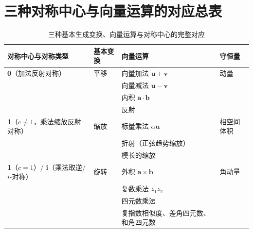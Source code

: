 \section{\texorpdfstring{三种对称中心与向量运算的对应总表}{三种对称中心与向量运算的对应总表}}

\begin{table}[htbp]
    \centering
    \caption{三种基本生成变换、向量运算与对称中心的完整对应}
    \label{tab:symmetry_correspondence}
    \renewcommand{\arraystretch}{1.35}
    \begin{tabular}{>{\centering\arraybackslash}p{2.5cm}>{\centering\arraybackslash}p{2.5cm}>{\centering\arraybackslash}p{4.5cm}>{\centering\arraybackslash}p{3cm}}
        \toprule
        对称中心与对称类型 & 基本变换 & 向量运算 & 守恒量 \\
        \midrule
        \textbf{0}（加法反射对称） & 平移 & 向量加法 $\mathbf{u}+\mathbf{v}$ & 动量 \\[4pt]
         &  & 向量减法 $\mathbf{u}-\mathbf{v}$ &  \\[4pt]
         &  & 内积 $\mathbf{a}\cdot\mathbf{b}$ &  \\[4pt]
         &  & 反射 &  \\
        \midrule
        \textbf{1}（$c \neq 1$，乘法缩放反射对称） & 缩放 & 标量乘法 $\alpha\mathbf{u}$ & 相空间体积 \\[4pt]
         &  & 折射（正弦趋势缩放） &  \\[4pt]
         &  & 模长的缩放 &  \\
        \midrule
        \textbf{1}（$c=1$）/ \textbf{i}（乘法取逆/$i$-对称） & 旋转 & 外积 $\mathbf{a}\times\mathbf{b}$ & 角动量 \\[4pt]
         &  & 复数乘法 $z_1 z_2$ &  \\[4pt]
         &  & 四元数乘法 &  \\[4pt]
         &  & 复指数相似度、差角四元数、和角四元数 &  \\
        \bottomrule
    \end{tabular}
\end{table}

